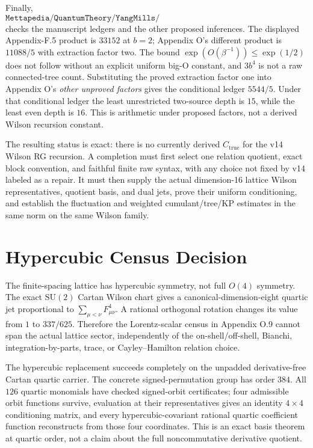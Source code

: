 \documentclass[11pt]{article}
\newcommand{\lean}[1]{\texttt{#1}}
\begin{document}
Finally,
\[
  \lean{Mettapedia/QuantumTheory/YangMills/WilsonExtractionRecombinationConstant.lean}
\]
checks the manuscript ledgers and the other proposed inferences.  The displayed
Appendix-F.5 product is \(33152\) at \(b=2\); Appendix O's different product is
\(11088/5\) with extraction factor two.  The bound
\(\exp(O(\beta^{-1}))\leq\exp(1/2)\) does not follow without an explicit uniform
big-O constant, and \(3b^4\) is not a raw connected-tree count.  Substituting
the proved extraction factor one into Appendix O's \emph{other unproved
factors} gives the conditional ledger \(5544/5\).  Under that conditional
ledger the least unrestricted two-source depth is \(15\), while the least even
depth is \(16\).  This is arithmetic under proposed factors, not a derived
Wilson recursion constant.

The resulting status is exact: there is no currently derived
\(C_{\mathrm{true}}\) for the v14 Wilson RG recursion.  A completion must first
select one relation quotient, exact block convention, and faithful finite raw
syntax, with any choice not fixed by v14 labeled as a repair.  It must then
supply the actual dimension-16 lattice Wilson representatives, quotient basis,
and dual jets, prove their uniform conditioning, and establish the fluctuation
and weighted cumulant/tree/KP estimates in the same norm on the same Wilson
family.

\section{Hypercubic Census Decision}

The finite-spacing lattice has hypercubic symmetry, not full \(O(4)\)
symmetry.  The exact \(\mathrm{SU}(2)\) Cartan Wilson chart gives a
canonical-dimension-eight quartic jet proportional to
\(\sum_{\mu<\nu}F_{\mu\nu}^{4}\).  A rational orthogonal rotation changes its
value from \(1\) to \(337/625\).  Therefore the Lorentz-scalar census in
Appendix O.9 cannot span the actual lattice sector, independently of the
on-shell/off-shell, Bianchi, integration-by-parts, trace, or
Cayley--Hamilton relation choice.

The hypercubic replacement succeeds completely on the unpadded
derivative-free Cartan quartic carrier.  The concrete signed-permutation group
has order \(384\).  All \(126\) quartic monomials have checked signed-orbit
certificates; four admissible orbit functions survive, evaluation at their
representatives gives an identity \(4\times4\) conditioning matrix, and every
hypercubic-covariant rational quartic coefficient function reconstructs from
those four coordinates.  This is an exact basis theorem at quartic order, not
a claim about the full noncommutative derivative quotient.
\end{document}
